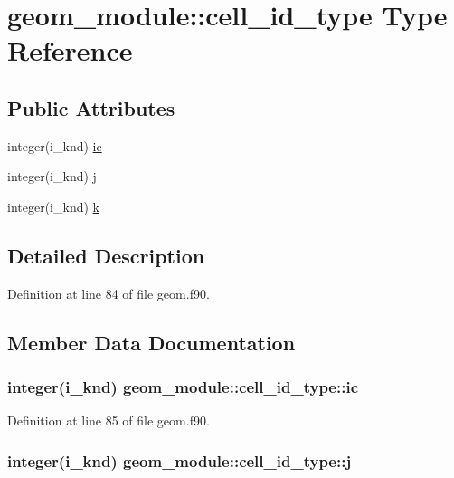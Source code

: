 \hypertarget{structgeom__module_1_1cell__id__type}{\section{geom\-\_\-module\-:\-:cell\-\_\-id\-\_\-type Type Reference}
\label{structgeom__module_1_1cell__id__type}
}
\subsection*{Public Attributes}
\begin{DoxyCompactItemize}
\item 
integer(i\-\_\-knd) \hyperlink{structgeom__module_1_1cell__id__type_a7e95ae5f47164a6f96e40364924f303a}{ic}
\item 
integer(i\-\_\-knd) \hyperlink{structgeom__module_1_1cell__id__type_abe3981884e1c0aa68dea95ba24bbaf29}{j}
\item 
integer(i\-\_\-knd) \hyperlink{structgeom__module_1_1cell__id__type_a36bd9730e34c4ed402a52da97e467010}{k}
\end{DoxyCompactItemize}


\subsection{Detailed Description}


Definition at line 84 of file geom.\-f90.



\subsection{Member Data Documentation}
\hypertarget{structgeom__module_1_1cell__id__type_a7e95ae5f47164a6f96e40364924f303a}{
\subsubsection[{ic}]{\setlength{\rightskip}{0pt plus 5cm}integer(i\-\_\-knd) geom\-\_\-module\-::cell\-\_\-id\-\_\-type\-::ic}}\label{structgeom__module_1_1cell__id__type_a7e95ae5f47164a6f96e40364924f303a}


Definition at line 85 of file geom.\-f90.

\hypertarget{structgeom__module_1_1cell__id__type_abe3981884e1c0aa68dea95ba24bbaf29}{
\subsubsection[{j}]{\setlength{\rightskip}{0pt plus 5cm}integer(i\-\_\-knd) geom\-\_\-module\-::cell\-\_\-id\-\_\-type\-::j}}\label{structgeom__module_1_1cell__id__type_abe3981884e1c0aa68dea95ba24bbaf29}


